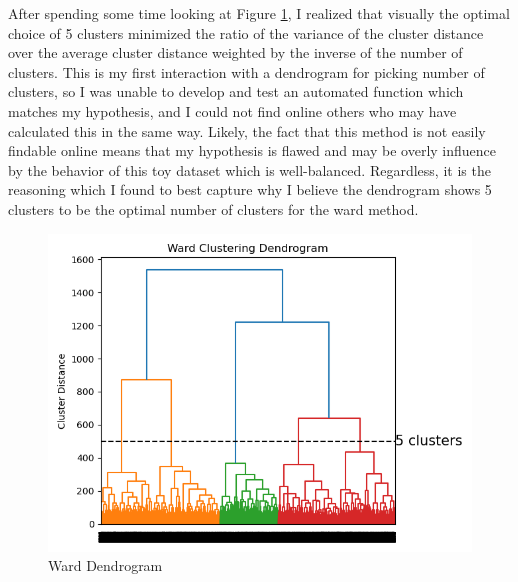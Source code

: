 \documentclass[12pt]{article}
\begin{document}
After spending some time looking at Figure \ref{figure4}, I realized that visually the optimal choice of 5 clusters 
minimized the ratio of the variance of the cluster distance over the average cluster distance weighted by the inverse
of the number of
clusters. This is my first interaction with a dendrogram for picking number of clusters, so I was unable to develop and 
test an automated function which matches my hypothesis, and I could not find online others who may have calculated this 
in the same way. Likely, the fact that this method is not easily findable online means that my hypothesis is flawed and
may be overly influence by the behavior of this toy dataset which is well-balanced. Regardless, it is the reasoning which 
I found to best capture why I believe the dendrogram shows 5 clusters to be the optimal number of clusters for the ward method.
\begin{figure}
    \includegraphics{../results/agglo/Warddendrogram.png}
    \caption{Ward Dendrogram}
    \label{figure4}
\end{figure}
\end{document}
